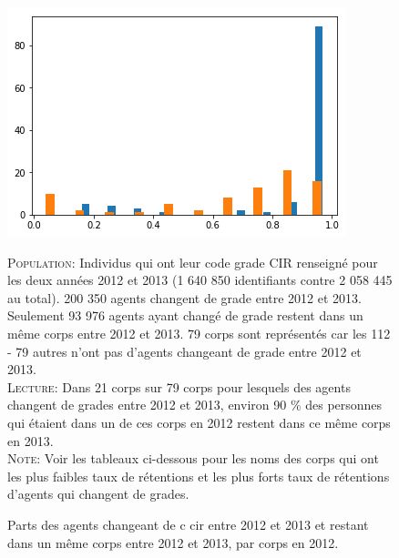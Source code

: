 \documentclass[11pt,a4paper]{article}
\begin{document}
\clearpage

\begin{figure}[H] 
	\caption{Parts des agents changeant de c cir entre 2012 et 2013 et restant dans un même corps entre 2012 et 2013, par corps en 2012.}
	\label{transit1} 
	\includegraphics[scale = 0.7]{transitions_intra_corps_only_w_c_cir_change_2012_2013.png} 
	\begin{minipage}{15cm}
		\footnotesize
		\textsc{Population:} Individus qui ont leur code grade CIR renseigné pour les deux années 2012 et 2013 (1 640 850 identifiants contre 2 058 445 au total). 200 350 agents changent de grade entre 2012 et 2013. Seulement 93 976 agents ayant changé de grade restent dans un même corps entre 2012 et 2013. 79 corps sont représentés car les 112 - 79 autres n'ont pas d'agents changeant de grade entre 2012 et 2013.\\
		\textsc{Lecture:} Dans 21 corps sur 79 corps pour lesquels des agents changent de grades entre 2012 et 2013, environ 90 \% des personnes qui étaient dans un de ces corps en 2012 restent dans ce même corps en 2013. \\
		\textsc{Note:} Voir les tableaux ci-dessous pour les noms des corps qui ont les plus faibles taux de rétentions et les plus forts taux de rétentions d'agents qui changent de grades.
	\end{minipage}
\end{figure}
\end{document}
